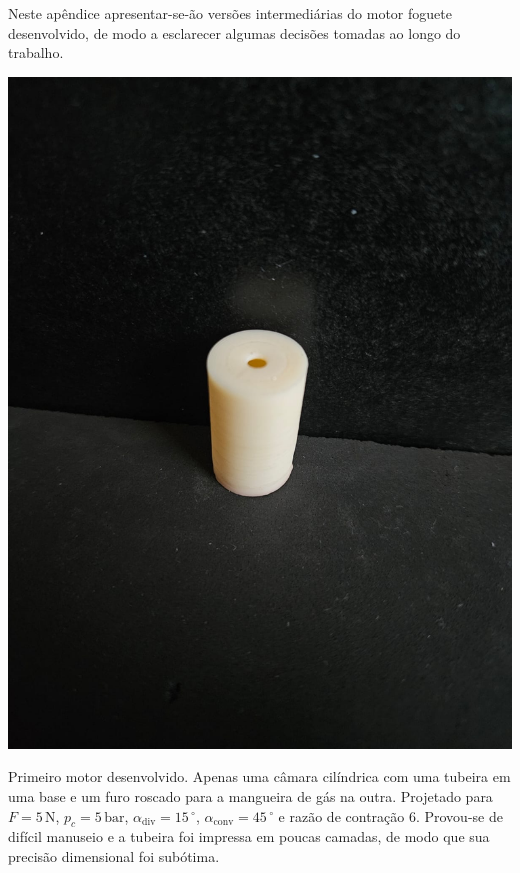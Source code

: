 Neste apêndice apresentar-se-ão versões intermediárias do motor foguete desenvolvido, de modo a esclarecer algumas decisões tomadas ao longo do trabalho.

\begin{minipage}{.49\textwidth}
    \includegraphics[width=\textwidth]{img/app_dev_history/motor1.jpeg}
\end{minipage}
\begin{minipage}{.49\textwidth}
    Primeiro motor desenvolvido. Apenas uma câmara cilíndrica com uma tubeira em uma base e um furo roscado para a mangueira de gás na outra. Projetado para \(F = 5\,\mathrm{N}\), \(p_c = 5\,\mathrm{bar}\), \(\alpha_{\mathrm{div}} = 15\,\mathrm{^\circ}\), \(\alpha_{\mathrm{conv}} = 45\,\mathrm{^\circ}\) e razão de contração 6. Provou-se de difícil manuseio e a tubeira foi impressa em poucas camadas, de modo que sua precisão dimensional foi subótima.
\end{minipage}


